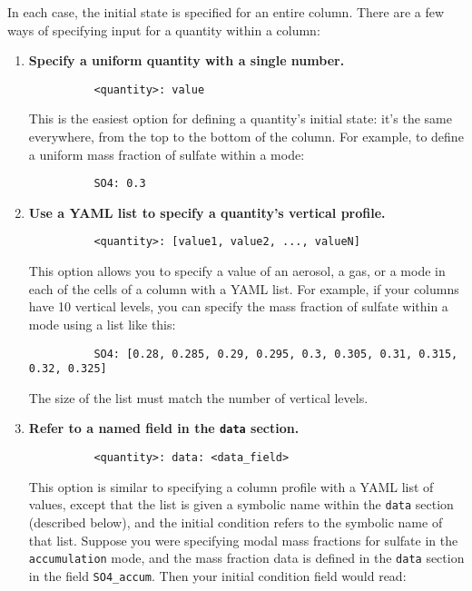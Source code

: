 In each case, the initial state is specified for an entire column. There are a
few ways of specifying input for a quantity within a column:

\begin{enumerate}
  \item {\bf Specify a uniform quantity with a single number.}
        \begin{verbatim}
          <quantity>: value
        \end{verbatim}
        This is the easiest option for defining a quantity's initial state: it's
        the same everywhere, from the top to the bottom of the column. For
        example, to define a uniform mass fraction of sulfate within a mode:
        \begin{verbatim}
          SO4: 0.3
        \end{verbatim}
  \item {\bf Use a YAML list to specify a quantity's vertical profile.}
        \begin{verbatim}
          <quantity>: [value1, value2, ..., valueN]
        \end{verbatim}
        This option allows you to specify a value of an aerosol, a gas, or a mode
        in each of the cells of a column with a YAML list. For example, if your
        columns have 10 vertical levels, you can specify the mass fraction of
        sulfate within a mode using a list like this:
        \begin{verbatim}
          SO4: [0.28, 0.285, 0.29, 0.295, 0.3, 0.305, 0.31, 0.315, 0.32, 0.325]
        \end{verbatim}
        The size of the list must match the number of vertical levels.
  \item {\bf Refer to a named field in the \texttt{data} section.}
        \begin{verbatim}
          <quantity>: data: <data_field>
        \end{verbatim}
        This option is similar to specifying a column profile with a YAML list
        of values, except that the list is given a symbolic name within the
        \texttt{data} section (described below), and the initial condition refers
        to the symbolic name of that list. Suppose you were specifying modal
        mass fractions for sulfate in the \texttt{accumulation} mode, and the
        mass fraction data is defined in the \texttt{data} section in the field
        \texttt{SO4\_accum}. Then your initial condition field would read:
        \begin{verbatim}

\end{verbatim}
\end{enumerate}
